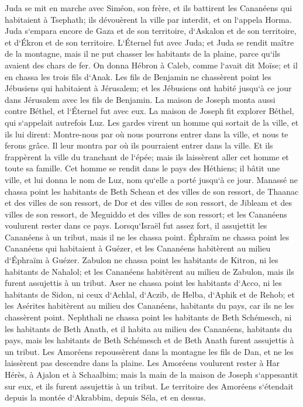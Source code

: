 \verse Juda se mit en marche avec Siméon, son frère, et ils battirent les Cananéens qui habitaient à Tsephath; ils dévouèrent la ville par interdit, et on l`appela Horma. 
\verse Juda s`empara encore de Gaza et de son territoire, d`Askalon et de son territoire, et d`Ékron et de son territoire. 
\verse L`Éternel fut avec Juda; et Juda se rendit maître de la montagne, mais il ne put chasser les habitants de la plaine, parce qu`ils avaient des chars de fer. 
\verse On donna Hébron à Caleb, comme l`avait dit Moïse; et il en chassa les trois fils d`Anak. 
\verse Les fils de Benjamin ne chassèrent point les Jébusiens qui habitaient à Jérusalem; et les Jébusiens ont habité jusqu`à ce jour dans Jérusalem avec les fils de Benjamin. 
\verse La maison de Joseph monta aussi contre Béthel, et l`Éternel fut avec eux. 
\verse La maison de Joseph fit explorer Béthel, qui s`appelait autrefois Luz. 
\verse Les gardes virent un homme qui sortait de la ville, et ils lui dirent: Montre-nous par où nous pourrons entrer dans la ville, et nous te ferons grâce. 
\verse Il leur montra par où ils pourraient entrer dans la ville. Et ils frappèrent la ville du tranchant de l`épée; mais ils laissèrent aller cet homme et toute sa famille. 
\verse Cet homme se rendit dans le pays des Héthiens; il bâtit une ville, et lui donna le nom de Luz, nom qu`elle a porté jusqu`à ce jour. 
\verse Manassé ne chassa point les habitants de Beth Schean et des villes de son ressort, de Thaanac et des villes de son ressort, de Dor et des villes de son ressort, de Jibleam et des villes de son ressort, de Meguiddo et des villes de son ressort; et les Cananéens voulurent rester dans ce pays. 
\verse Lorsqu`Israël fut assez fort, il assujettit les Cananéens à un tribut, mais il ne les chassa point. 
\verse Éphraïm ne chassa point les Cananéens qui habitaient à Guézer, et les Cananéens habitèrent au milieu d`Éphraïm à Guézer. 
\verse Zabulon ne chassa point les habitants de Kitron, ni les habitants de Nahalol; et les Cananéens habitèrent au milieu de Zabulon, mais ils furent assujettis à un tribut. 
\verse Aser ne chassa point les habitants d`Acco, ni les habitants de Sidon, ni ceux d`Achlal, d`Aczib, de Helba, d`Aphik et de Rehob; 
\verse et les Asérites habitèrent au milieu des Cananéens, habitants du pays, car ils ne les chassèrent point. 
\verse Nephthali ne chassa point les habitants de Beth Schémesch, ni les habitants de Beth Anath, et il habita au milieu des Cananéens, habitants du pays, mais les habitants de Beth Schémesch et de Beth Anath furent assujettis à un tribut. 
\verse Les Amoréens repoussèrent dans la montagne les fils de Dan, et ne les laissèrent pas descendre dans la plaine. 
\verse Les Amoréens voulurent rester à Har Hérès, à Ajalon et à Schaalbim; mais la main de la maison de Joseph s`appesantit sur eux, et ils furent assujettis à un tribut. 
\verse Le territoire des Amoréens s`étendait depuis la montée d`Akrabbim, depuis Séla, et en dessus. 


